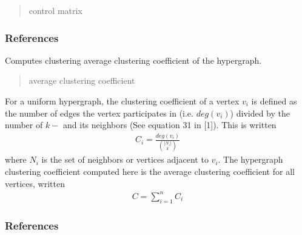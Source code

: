 \documentclass[letterpaper,10pt,english]{sphinxmanual}
\begin{document}
\begin{fulllineitems}
\begin{fulllineitems}
\begin{quote}
\begin{description}
\sphinxAtStartPar
control matrix

\sphinxAtStartPar
{}

\end{description}\end{quote}
\subsubsection*{References}

\end{fulllineitems}


\begin{fulllineitems}
\label{\detokenize{HAT:HAT.Hypergraph.Hypergraph.clusteringCoef}}
\pysigstartsignatures
{}
\pysigstopsignatures
\sphinxAtStartPar
Computes clustering average clustering coefficient of the hypergraph.
\begin{quote}\begin{description}
\sphinxAtStartPar
average clustering coefficient

\sphinxAtStartPar
{}

\end{description}\end{quote}

\sphinxAtStartPar
For a uniform hypergraph, the clustering coefficient of a vertex \(v_i\)
is defined as the number of edges the vertex participates in (i.e. \(deg(v_i)\)) divided
by the number of \(k-\) and its neighbors
(See equation 31 in {[}1{]}). This is written
\begin{equation*}
\begin{split}C_i = \frac{deg(v_i)}{\binom{|N_i|}{k}}\end{split}
\end{equation*}
\sphinxAtStartPar
where \(N_i\) is the set of neighbors or vertices adjacent to \(v_i\). The hypergraph
clustering coefficient computed here is the average clustering coefficient for all vertices,
written
\begin{equation*}
\begin{split}C=\sum_{i=1}^nC_i\end{split}
\end{equation*}\subsubsection*{References}


\end{fulllineitems}
\end{fulllineitems}
\end{document}
